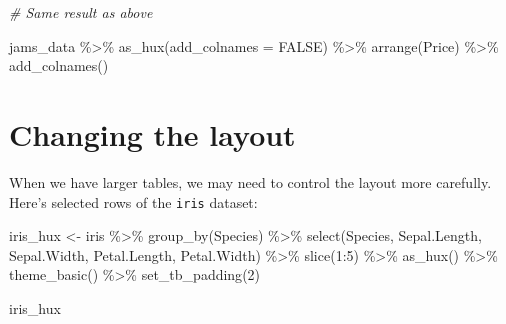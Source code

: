 \documentclass[
]{article}
\newenvironment{Shaded}{\begin{snugshade}}{\end{snugshade}}
\newcommand{\AttributeTok}[1]{\textcolor[rgb]{0.77,0.63,0.00}{#1}}
\newcommand{\CommentTok}[1]{\textcolor[rgb]{0.56,0.35,0.01}{\textit{#1}}}
\newcommand{\ConstantTok}[1]{\textcolor[rgb]{0.00,0.00,0.00}{#1}}
\newcommand{\DecValTok}[1]{\textcolor[rgb]{0.00,0.00,0.81}{#1}}
\newcommand{\FunctionTok}[1]{\textcolor[rgb]{0.00,0.00,0.00}{#1}}
\newcommand{\NormalTok}[1]{#1}
\newcommand{\OtherTok}[1]{\textcolor[rgb]{0.56,0.35,0.01}{#1}}
\newcommand{\SpecialCharTok}[1]{\textcolor[rgb]{0.00,0.00,0.00}{#1}}
\begin{document}
\begin{Shaded}
\begin{Highlighting}[]
\CommentTok{\# Same result as above}

\NormalTok{jams\_data }\SpecialCharTok{\%\textgreater{}\%} 
      \FunctionTok{as\_hux}\NormalTok{(}\AttributeTok{add\_colnames =} \ConstantTok{FALSE}\NormalTok{) }\SpecialCharTok{\%\textgreater{}\%} 
      \FunctionTok{arrange}\NormalTok{(Price) }\SpecialCharTok{\%\textgreater{}\%} 
      \FunctionTok{add\_colnames}\NormalTok{()}
\end{Highlighting}
\end{Shaded}

\FloatBarrier

\hypertarget{changing-the-layout}{%
\section{Changing the layout}\label{changing-the-layout}}

When we have larger tables, we may need to control the layout more
carefully. Here's selected rows of the \texttt{iris} dataset:

\begin{Shaded}
\begin{Highlighting}[]
\NormalTok{iris\_hux }\OtherTok{\textless{}{-}}\NormalTok{ iris }\SpecialCharTok{\%\textgreater{}\%} 
      \FunctionTok{group\_by}\NormalTok{(Species) }\SpecialCharTok{\%\textgreater{}\%} 
      \FunctionTok{select}\NormalTok{(Species, Sepal.Length, Sepal.Width, Petal.Length, Petal.Width) }\SpecialCharTok{\%\textgreater{}\%} 
      \FunctionTok{slice}\NormalTok{(}\DecValTok{1}\SpecialCharTok{:}\DecValTok{5}\NormalTok{) }\SpecialCharTok{\%\textgreater{}\%} 
      \FunctionTok{as\_hux}\NormalTok{() }\SpecialCharTok{\%\textgreater{}\%}
      \FunctionTok{theme\_basic}\NormalTok{() }\SpecialCharTok{\%\textgreater{}\%} 
      \FunctionTok{set\_tb\_padding}\NormalTok{(}\DecValTok{2}\NormalTok{)}

\NormalTok{iris\_hux      }
\end{Highlighting}
\end{Shaded}

 
  \providecommand{\huxb}[2]{\arrayrulecolor[RGB]{#1}\global\arrayrulewidth=#2pt}
  \providecommand{\huxvb}[2]{\color[RGB]{#1}\vrule width #2pt}
  \providecommand{\huxtpad}[1]{\rule{0pt}{#1}}
  \providecommand{\huxbpad}[1]{\rule[-#1]{0pt}{#1}}
\end{document}
